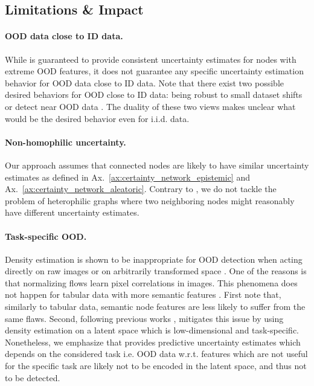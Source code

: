 \subsection{Limitations \& Impact} 
\label{sec:limitations_009}

\paragraph{OOD data close to ID data.} While \GPNacro{} is guaranteed to provide consistent uncertainty estimates for nodes with extreme OOD features, it does not guarantee any specific uncertainty estimation behavior for OOD data close to ID data. Note that there exist two possible desired behaviors for OOD close to ID data: being robust to small dataset shifts \citep{dataset-shift, stutz2020} or detect near OOD data \citep{contrastive-ood, robustness-uncertainty-dirichlet, attack-detection}. The duality of these two views makes unclear what would be the desired behavior even for i.i.d. data.

\paragraph{Non-homophilic uncertainty.} Our approach assumes that connected nodes are likely to have similar uncertainty estimates as defined in Ax.~\ref{ax:certainty_network_epistemic} and Ax.~\ref{ax:certainty_network_aleatoric}. Contrary to \cite{heterophily-gnn}, we do not tackle the problem of heterophilic graphs where two neighboring nodes might reasonably have different uncertainty estimates. 

\paragraph{Task-specific OOD.} Density estimation is shown to be inappropriate for OOD detection when acting directly on raw images \cite{typicality_OOD_generative, anomaly-detection, deep-generative} or on arbitrarily transformed space \cite{perfect-density-no-ood-guarantee}. One of the reasons is that normalizing flows learn pixel correlations in images. This phenomena  does not happen for tabular data with more semantic features \citep{why-nf-fail-ood}. First note that, similarly to tabular data, semantic node features are less likely to suffer from the same flaws. Second, following previous works \citep{charpentier2020, NatPN2021, why-nf-fail-ood, density-states-ood, contrastive-ood}, \GPNacro{} mitigates this issue by using density estimation on a latent space which is low-dimensional and task-specific. Nonetheless, we emphasize that \GPNacro{} provides predictive uncertainty estimates which depends on the considered task i.e. OOD data w.r.t. features which are not useful for the specific task are likely not to be encoded in the latent space, and thus not to be detected.


